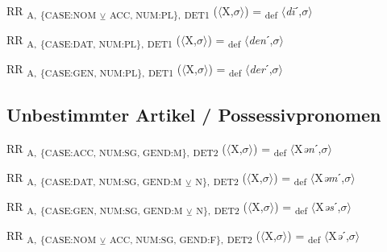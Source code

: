 {\begin{exe}
 RR \textsubscript{A,} \textsubscript{\{CASE:NOM} \textsubscript{${\veebar}$}\textsubscript{ ACC, NUM:PL\},} \textsubscript{DET1} ($\langle$X,$\sigma $$\rangle$) = \textsubscript{def} $\langle$\textit{d\=i}ˊ,$\sigma $$\rangle$
\end{exe}

\begin{exe}
 RR \textsubscript{A,} \textsubscript{\{CASE:DAT, NUM:PL\},} \textsubscript{DET1} ($\langle$X,$\sigma $$\rangle$) = \textsubscript{def} $\langle$\textit{den}ˊ,$\sigma $$\rangle$
\end{exe}

\begin{exe}
 RR \textsubscript{A,} \textsubscript{\{CASE:GEN, NUM:PL\},} \textsubscript{DET1} ($\langle$X,$\sigma $$\rangle$) = \textsubscript{def} $\langle$\textit{der}ˊ,$\sigma $$\rangle$
\end{exe}

\subsection{Unbestimmter Artikel / Possessivpronomen}

\begin{exe}
 RR \textsubscript{A,} \textsubscript{\{CASE:ACC, NUM:SG, GEND:M\},} \textsubscript{DET2} ($\langle$X,$\sigma $$\rangle$) = \textsubscript{def} $\langle$X\textit{ən}ˊ,$\sigma $$\rangle$
\end{exe}

\begin{exe}
 RR \textsubscript{A,} \textsubscript{\{CASE:DAT, NUM:SG, GEND:M} \textsubscript{${\veebar}$}\textsubscript{ N\},} \textsubscript{DET2} ($\langle$X,$\sigma $$\rangle$) = \textsubscript{def} $\langle$X\textit{əm}ˊ,$\sigma $$\rangle$
\end{exe}

\begin{exe}
 RR \textsubscript{A,} \textsubscript{\{CASE:GEN, NUM:SG, GEND:M} \textsubscript{${\veebar}$}\textsubscript{ N\},} \textsubscript{DET2} ($\langle$X,$\sigma $$\rangle$) = \textsubscript{def} $\langle$X\textit{əs}ˊ,$\sigma $$\rangle$
\end{exe}

\begin{exe}
 RR \textsubscript{A,} \textsubscript{\{CASE:NOM} \textsubscript{${\veebar}$}\textsubscript{ ACC, NUM:SG, GEND:F\},} \textsubscript{DET2} ($\langle$X,$\sigma $$\rangle$) = \textsubscript{def} $\langle$X\textit{ə}ˊ,$\sigma $$\rangle$
\end{exe}

}
